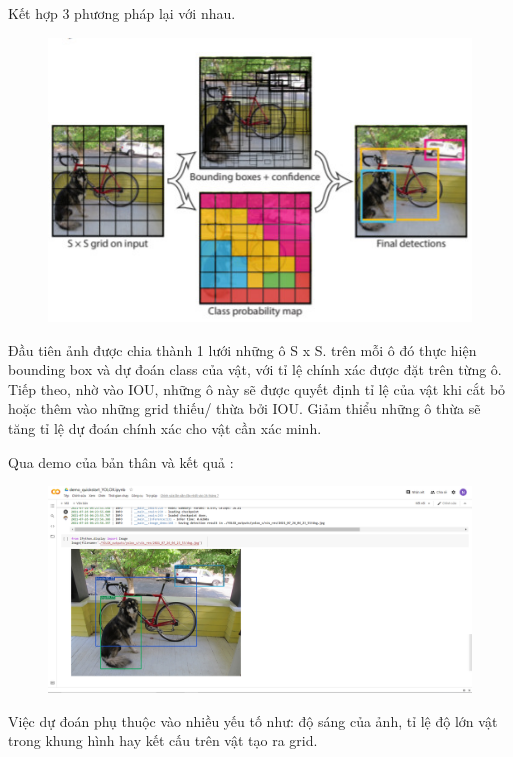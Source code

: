 \documentclass{article}
\begin{document}
	Kết hợp 3 phương pháp lại với nhau.
	\begin{figure}[H]
			\centering
			\includegraphics[width=1\linewidth]{images/b2_2.png}
			\label{fig:writing-thesis}
	\end{figure}
	Đầu tiên ảnh được chia thành 1 lưới những ô S x S. trên mỗi ô đó thực hiện bounding box và dự đoán class của vật, với tỉ lệ chính xác được đặt trên từng ô. Tiếp theo, nhờ vào IOU, những ô này sẽ được quyết định tỉ lệ của vật khi cắt bỏ hoặc thêm vào những grid thiếu/ thừa bởi IOU. Giảm thiểu những ô thừa sẽ tăng tỉ lệ dự đoán chính xác cho vật cần xác minh.
	
	Qua demo của bản thân và kết quả :
	\begin{figure}[H]
			\centering
			\includegraphics[width=1\linewidth]{images/b2_3.png}
			\label{fig:writing-thesis}
	\end{figure}
	
	Việc dự đoán phụ thuộc vào nhiều yếu tố như: độ sáng của ảnh, tỉ lệ độ lớn vật trong khung hình hay kết cấu trên vật tạo ra grid.
\end{document}

